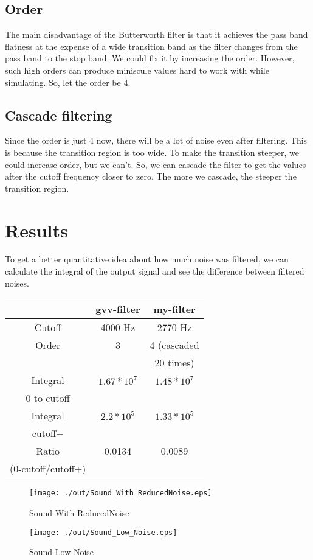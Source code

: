 \documentclass[journal,12pt]{IEEEtran}
\begin{document}
\subsection{\textbf{Order}}
The main disadvantage of the Butterworth filter is that it achieves the pass band flatness at the expense of a wide transition band as the filter changes from the pass band to the stop band.
We could fix it by increasing the order. However, such high orders can produce miniscule values hard to work with while simulating. So, let the order be 4.

\subsection{\textbf{Cascade filtering}}
Since the order is just 4 now, there will be a lot of noise even after filtering. This is because the transition region is too wide. To make the transition steeper, we could increase order, but we can't. So, we can cascade the filter to get the values after the cutoff frequency closer to zero. The more we cascade, the steeper the transition region.

\section{\textbf{Results}}
To get a better quantitative idea about how much noise was filtered, we can calculate the integral of the output signal and see the difference between filtered noises.

\begin{center}
  \begin{tabular}{ |c|c|c| }

    \hline
                       & \textbf{gvv-filter} & \textbf{my-filter} \\
    \hline
    Cutoff             & 4000 Hz             & 2770 Hz            \\
    \hline
    Order              & 3                   & 4 (cascaded        \\
                       &                     & 20 times)          \\
    \hline
    Integral           & $1.67*10^7$         & $1.48*10^7$        \\
    0 to cutoff        &                     &                    \\
    \hline
    Integral           & $2.2*10^5$          & $1.33*10^5$        \\
    cutoff+            &                     &                    \\
    \hline
    Ratio              & 0.0134              & 0.0089             \\
    (0-cutoff/cutoff+) &                     &                    \\
    \hline
  \end{tabular}
\end{center}

\begin{figure}[!h]
  \centering
  \texttt{[image: ./out/Sound\_With\_ReducedNoise.eps]}
  \caption{Sound With ReducedNoise}
\end{figure}

\begin{figure}[!h]
  \centering
  \texttt{[image: ./out/Sound\_Low\_Noise.eps]}
  \caption{Sound Low Noise}
\end{figure}
\end{document}
